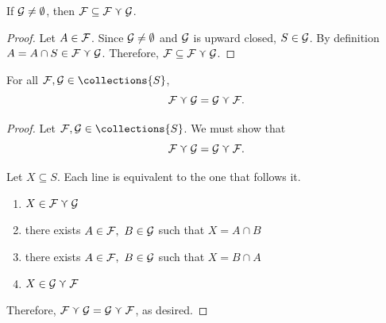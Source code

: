 \begin{theorem}
    \label{thm_classcap_contains_union}
     If $\mathcal{G} \neq \emptyset$, then $\mathcal{F} \subseteq \mathcal{F} \curlyvee \mathcal{G}$.
\end{theorem}

\begin{proof}
    

     Let $A \in \mathcal{F}$.  Since $\mathcal{G} \neq \emptyset$ and $\mathcal{G}$ is upward closed, $S \in \mathcal{G}$.  By definition $A = A \cap S \in \mathcal{F} \curlyvee \mathcal{G}$.  Therefore, $\mathcal{F} \subseteq \mathcal{F} \curlyvee \mathcal{G}$.
\end{proof}


\begin{theorem}
    \label{thm_classcap_commutative}
    \leanok{}
    For all $\family, \familytwo \in \collections{S}$,
    \[\mathcal{F} \curlyvee \mathcal{G} = \mathcal{G} \curlyvee \mathcal{F}.\]
\end{theorem}

\begin{proof}
    Let $\family, \familytwo \in \collections{S}$.  We must show that
    \[\mathcal{F} \curlyvee \mathcal{G} = \mathcal{G} \curlyvee \mathcal{F}.\]
    
    Let $X \subseteq S$. Each line is equivalent to the one that follows it.
    \begin{enumerate}
        \item $X \in \mathcal{F} \curlyvee \mathcal{G}$
        \item there exists $A \in \mathcal{F}, \ B \in \mathcal{G}$ such that $X = A \cap B$
        \item there exists $A \in \mathcal{F}, \ B \in \mathcal{G}$ such that $X = B \cap A$
        \item $X \in \mathcal{G} \curlyvee \mathcal{F}$
    \end{enumerate}
    Therefore, $\mathcal{F} \curlyvee \mathcal{G} = \mathcal{G} \curlyvee \mathcal{F}$, as desired.
\end{proof}

